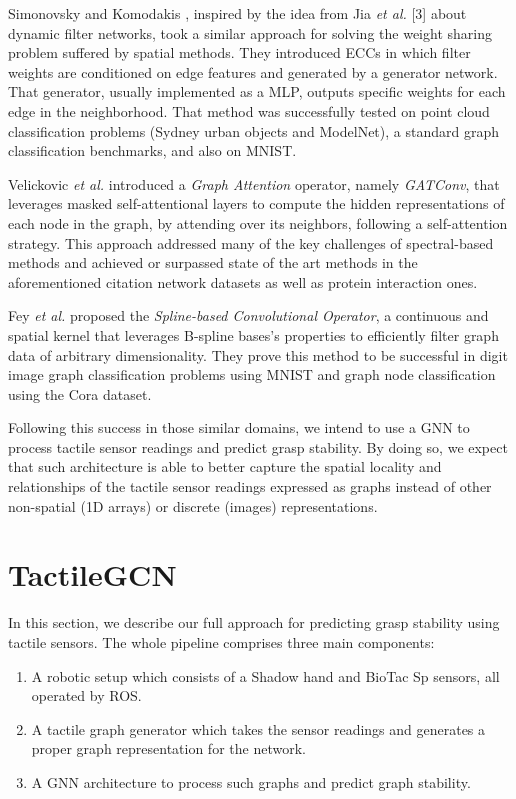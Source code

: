 Simonovsky and Komodakis \cite{Simonovsky2017}, inspired by the idea from Jia \emph{et al.} [3] about dynamic filter networks, took a similar approach for solving the weight sharing problem suffered by spatial methods. They introduced \acp{ECC} in which filter weights are conditioned on edge features and generated by a generator network. That generator, usually implemented as a \ac{MLP}, outputs specific weights for each edge in the neighborhood. That method was successfully tested on point cloud classification problems (Sydney urban objects and ModelNet), a standard graph classification benchmarks, and also on \acs{MNIST}.

Velickovic \emph{et al.} \cite{Velickovic2017} introduced a \emph{Graph Attention} operator, namely \emph{GATConv}, that leverages masked self-attentional layers to compute the hidden representations of each node in the graph, by attending over its neighbors, following a self-attention strategy. This approach addressed many of the key challenges of spectral-based methods and achieved or surpassed state of the art methods in the aforementioned citation network datasets as well as protein interaction ones.

Fey \emph{et al.} \cite{Fey2018} proposed the \emph{Spline-based Convolutional Operator}, a continuous and spatial kernel that leverages B-spline bases's properties to efficiently filter graph data of arbitrary dimensionality. They prove this method to be successful in digit image graph classification problems using \acs{MNIST} and graph node classification using the Cora dataset.

Following this success in those similar domains, we intend to use a \acs{GNN} to process tactile sensor readings and predict grasp stability. By doing so, we expect that such architecture is able to better capture the spatial locality and relationships of the tactile sensor readings expressed as graphs instead of other non-spatial (\acs{1D} arrays) or discrete (images) representations.

\section{TactileGCN}
\label{cha:tactile:sec:tactilegcn}

In this section, we describe our full approach for predicting grasp stability using tactile sensors. The whole pipeline comprises three main components:

\begin{enumerate}
    \item A robotic setup which consists of a Shadow hand and BioTac Sp sensors, all operated by \ac{ROS}.
    \item A tactile graph generator which takes the sensor readings and generates a proper graph representation for the network.
    \item A \ac{GNN} architecture to process such graphs and predict graph stability.
\end{enumerate}

